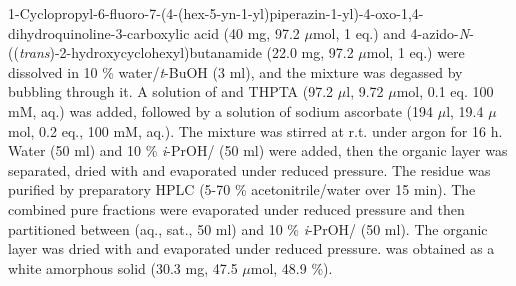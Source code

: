 {1-Cyclopropyl-6-fluoro-7-(4-(hex-5-yn-1-yl)piperazin-1-yl)-4-oxo-1,4\hyp{}dihydro\-quinoline-3-carboxylic acid  (40 mg, 97.2 $\mu$mol, 1 eq.) and 4\hyp{}azido\hyp{}\textit{N}\hyp{}((\textit{trans})\hyp{}2\hyp{}hydroxycyclohexyl)butanamide   (22.0 mg, 97.2 $\mu$mol, 1 eq.) were dissolved in 10 \% water/\textit{t}-BuOH (3 ml), and the mixture was degassed by bubbling  through it. 
A solution of  and THPTA (97.2 $\mu$l, 9.72 $\mu$mol, 0.1 eq. 100 mM, aq.) was added, followed by a solution of sodium ascorbate (194 $\mu$l, 19.4 $\mu$mol, 0.2 eq., 100 mM, aq.). 
The mixture was stirred at r.t. under argon for 16 h. Water (50 ml) and 10 \% \textit{i}-PrOH/ (50 ml) were added, then the organic layer was separated, dried with  and evaporated under reduced pressure. The residue was purified by preparatory HPLC (5-70 \% acetonitrile/water over 15 min). 
The combined pure fractions were evaporated under reduced pressure and then partitioned between  (aq., sat., 50 ml) and 10 \% \textit{i}-PrOH/ (50 ml). The organic layer was dried with  and evaporated under reduced pressure.
 was obtained as a white amorphous solid (30.3 mg, 47.5 $\mu$mol, 48.9 \%).
\\[1\baselineskip]
\\[1\baselineskip]
}
